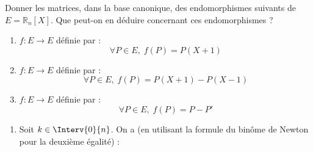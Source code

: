 \documentclass[a4paper,10pt]{report}
\begin{document}
\begin{Exercice}{} Donner les matrices, dans la base canonique, des endomorphismes suivants de $E=\mathbb{R}_n[X]$. Que peut-on en déduire concernant ces endomorphismes ?

\begin{enumerate}
\item $f : E \rightarrow E$ définie par :
$$ \forall P \in E, \; f(P) = P(X+1) $$
\item $f : E \rightarrow E$ définie par :
$$ \forall P \in E, \; f(P) = P(X+1)-P(X-1) $$
\item $f : E \rightarrow E$ définie par :
$$ \forall P \in E, \; f(P) = P-P' $$
\end{enumerate}
\end{Exercice} 

\begin{enumerate}
\item Soit $k \in \Interv{0}{n}$. On a (en utilisant la formule du binôme de Newton pour la deuxième égalité) : 


\end{enumerate}
\end{document}
